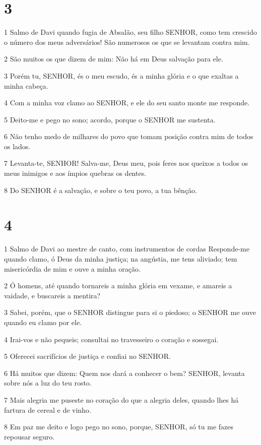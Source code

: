 \chapter{3}

\par 1 Salmo de Davi quando fugia de Absalão, seu filho SENHOR, como tem crescido o número dos meus adversários! São numerosos os que se levantam contra mim.
\par 2 São muitos os que dizem de mim: Não há em Deus salvação para ele.
\par 3 Porém tu, SENHOR, és o meu escudo, és a minha glória e o que exaltas a minha cabeça.
\par 4 Com a minha voz clamo ao SENHOR, e ele do seu santo monte me responde.
\par 5 Deito-me e pego no sono; acordo, porque o SENHOR me sustenta.
\par 6 Não tenho medo de milhares do povo que tomam posição contra mim de todos os lados.
\par 7 Levanta-te, SENHOR! Salva-me, Deus meu, pois feres nos queixos a todos os meus inimigos e aos ímpios quebras os dentes.
\par 8 Do SENHOR é a salvação, e sobre o teu povo, a tua bênção.

\chapter{4}

\par 1 Salmo de Davi ao mestre de canto, com instrumentos de cordas Responde-me quando clamo, ó Deus da minha justiça; na angústia, me tens aliviado; tem misericórdia de mim e ouve a minha oração.
\par 2 Ó homens, até quando tornareis a minha glória em vexame, e amareis a vaidade, e buscareis a mentira?
\par 3 Sabei, porém, que o SENHOR distingue para si o piedoso; o SENHOR me ouve quando eu clamo por ele.
\par 4 Irai-vos e não pequeis; consultai no travesseiro o coração e sossegai.
\par 5 Oferecei sacrifícios de justiça e confiai no SENHOR.
\par 6 Há muitos que dizem: Quem nos dará a conhecer o bem? SENHOR, levanta sobre nós a luz do teu rosto.
\par 7 Mais alegria me puseste no coração do que a alegria deles, quando lhes há fartura de cereal e de vinho.
\par 8 Em paz me deito e logo pego no sono, porque, SENHOR, só tu me fazes repousar seguro.

